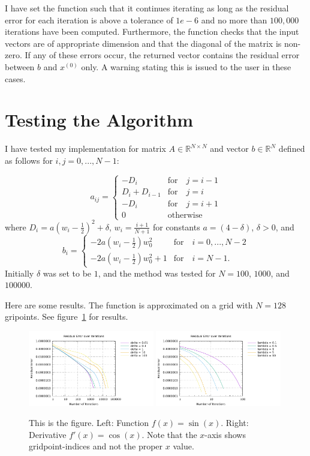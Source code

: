 \documentclass[10pt]{article}
\begin{document}
I have set the function such that it continues iterating as long as the residual error for each iteration is above a tolerance of $1e - 6$ and no more than $100,000$ iterations have been computed. Furthermore, the function checks that the input vectors are of appropriate dimension and that the diagonal of the matrix is non-zero. If any of these errors occur, the returned vector contains the residual error between $b$ and $x^{(0)}$ only. A warning stating this is issued to the user in these cases.

\section{Testing the Algorithm}
I have tested my implementation for matrix $A \in \mathbb{R}^{N \times N}$ and vector $b \in \mathbb{R}^N$ defined as follows for $i,j = 0,...,N-1$:

$$a_{ij}=
\begin{cases}
-D_i &\text{for} \quad j = i-1\\
D_i + D_{i-1} &\text{for} \quad j=i\\
-D_{i} &\text{for} \quad j = i + 1\\
0 &\text{otherwise}
\end{cases}
$$
where $D_i=a(w_i - \frac{1}{2})^2 + \delta$, $w_i = \frac{i+1}{N+1}$ for constants $a=(4-\delta)$, $\delta > 0$, and
$$b_{i}=
\begin{cases}
-2a(w_i - \frac{1}{2})w_0^2 &\text{for} \quad i = 0,...,N-2\\
-2a(w_i - \frac{1}{2})w_0^2 + 1 &\text{for} \quad i=N-1.
\end{cases}
$$
Initially $\delta$ was set to be $1$, and the method was tested for $N=100$, $1000$, and $100000$.

Here are some results. The function is approximated on a grid with
$N=128$ gripoints. See figure~\ref{fig:func_and_deriv} for results.
 \begin{figure}%
 \begin{center}
    \includegraphics[width=0.49\textwidth]{function}
    \includegraphics[width=0.49\textwidth]{function2}
  \end{center}
  \caption{This is the figure. Left: Function $f(x)=\sin(x)$. Right:
    Derivative $f'(x) = \cos(x)$. Note that the $x$-axis shows
    gridpoint-indices and not the proper $x$ value.
  \label{fig:func_and_deriv}}
\end{figure}
\end{document}
